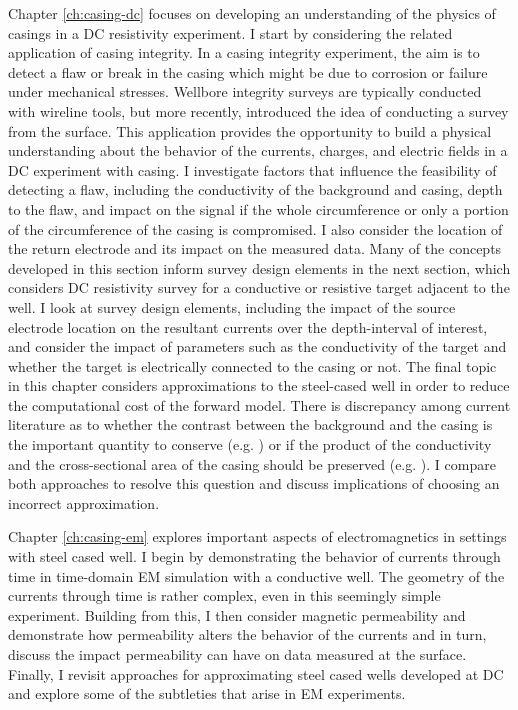 Chapter \ref{ch:casing-dc} focuses on developing an understanding of the physics of casings in a DC resistivity experiment. I start by considering the related application of casing integrity. In a casing integrity experiment, the aim is to detect a flaw or break in the casing which might be due to corrosion or failure under mechanical stresses. Wellbore integrity surveys are typically conducted with wireline tools, but more recently, \cite{Wilt2018} introduced the idea of conducting a survey from the surface. This application provides the opportunity to build a physical understanding about the behavior of the currents, charges, and electric fields in a DC experiment with casing. I investigate factors that influence the feasibility of detecting a flaw, including the conductivity of the background and casing, depth to the flaw, and impact on the signal if the whole circumference or only a portion of the circumference of the casing is compromised. I also consider the location of the return electrode and its impact on the measured data. Many of the concepts developed in this section inform survey design elements in the next section, which considers DC resistivity survey for a conductive or resistive target adjacent to the well. I look at survey design elements, including the impact of the source electrode location on the resultant currents over the depth-interval of interest, and consider the impact of parameters such as the conductivity of the target and whether the target is electrically connected to the casing or not. The final topic in this chapter considers approximations to the steel-cased well in order to reduce the computational cost of the forward model. There is discrepancy among current literature as to whether the contrast between the background and the casing is the important quantity to conserve (e.g. \cite{Um2015}) or if the product of the conductivity and the cross-sectional area of the casing should be preserved (e.g. \citep{Swidinsky2013}). I compare both approaches to resolve this question and discuss implications of choosing an incorrect approximation.

Chapter \ref{ch:casing-em} explores important aspects of electromagnetics in settings with steel cased well. I begin by demonstrating the behavior of currents through time in time-domain EM simulation with a conductive well. The geometry of the currents through time is rather complex, even in this seemingly simple experiment. Building from this, I then consider magnetic permeability and demonstrate how permeability alters the behavior of the currents and in turn, discuss the impact permeability can have on data measured at the surface. Finally, I revisit approaches for approximating steel cased wells developed at DC and explore some of the subtleties that arise in EM experiments.

